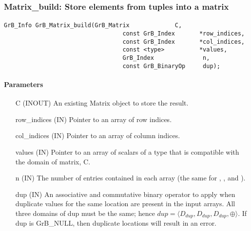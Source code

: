 \subsubsection{{\sf Matrix\_build}: Store elements from tuples into a matrix }
\label{Sec:Matrix_build}

\paragraph{\syntax}

\begin{Verbatim}[samepage=true]    
        GrB_Info GrB_Matrix_build(GrB_Matrix             C,
                                  const GrB_Index       *row_indices,
                                  const GrB_Index       *col_indices, 
                                  const <type>          *values,
                                  GrB_Index              n,
                                  const GrB_BinaryOp     dup);
\end{Verbatim}

\paragraph{Parameters}

\begin{itemize}[leftmargin=1.1in]
    \item[{\sf C}]      ({\sf INOUT}) An existing Matrix object to store the result.
    \item[{\sf row\_indices}] ({\sf IN}) Pointer to an array of row indices. 
    \item[{\sf col\_indices}] ({\sf IN}) Pointer to an array of column indices. 
    \item[{\sf values}] ({\sf IN}) Pointer to an array of scalars of a type that
                                   is compatible with the domain of matrix, {\sf C}.
    \item[{\sf n}]  ({\sf IN}) The number of entries contained in each array (the same for , , and ).
    \item[{\sf dup}]    ({\sf IN}) An associative and commutative binary operator 
    to apply when duplicate values for the same location are present in the input
    arrays. All three domains of {\sf dup} must be the same; hence
	    $dup=\langle D_{dup},D_{dup},D_{dup},\oplus \rangle$.
    If {\sf dup} is {\sf GrB\_NULL}, then duplicate locations will result in an error. 
\end{itemize}    

